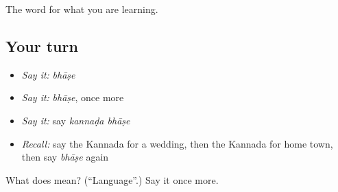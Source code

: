\begin{grammarlens}[title={What you've built}]
The word for what you are learning.
\end{grammarlens}

\subsection*{Your turn}
\begin{itemize}
\raggedright
  \item \emph{Say it:} \emph{bhāṣe}
  \item \emph{Say it:} \emph{bhāṣe}, once more
  \item \emph{Say it:} say \emph{kannaḍa bhāṣe}
  \item \emph{Recall:} say the Kannada for a wedding, then the Kannada for home town, then say \emph{bhāṣe} again
\end{itemize}

\begin{tcolorbox}[breakable,colback=teal!4,colframe=teal!35!black,title={Before you move on}]
What does  mean? (\textquotedblleft{}Language\textquotedblright{}.) Say it once more.
\end{tcolorbox}
